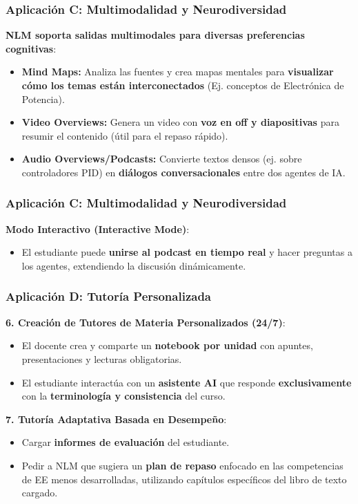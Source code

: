 \documentclass[aspectratio=43]{beamer}
\begin{document}
\begin{frame}
\frametitle{ Aplicación C: Multimodalidad y Neurodiversidad}

\textbf{NLM soporta salidas multimodales para diversas preferencias cognitivas}:
\begin{itemize}
    \item \textbf{Mind Maps:} Analiza las fuentes y crea mapas mentales para \textbf{visualizar cómo los temas están interconectados} (Ej. conceptos de Electrónica de Potencia).
    \item \textbf{Video Overviews:} Genera un video con \textbf{voz en off y diapositivas} para resumir el contenido (útil para el repaso rápido).
    \item \textbf{Audio Overviews/Podcasts:} Convierte textos densos (ej. sobre controladores PID) en \textbf{diálogos conversacionales} entre dos agentes de IA.
\end{itemize}
\end{frame}

\begin{frame}
\frametitle{ Aplicación C: Multimodalidad y Neurodiversidad}

\textbf{Modo Interactivo (Interactive Mode)}:
\begin{itemize}
    \item El estudiante puede \textbf{unirse al podcast en tiempo real} y hacer preguntas a los agentes, extendiendo la discusión dinámicamente.
\end{itemize}
\end{frame}

\begin{frame}
\frametitle{ Aplicación D: Tutoría Personalizada}

\textbf{6. Creación de Tutores de Materia Personalizados (24/7)}:
\begin{itemize}
    \item El docente crea y comparte un \textbf{notebook por unidad} con apuntes, presentaciones y lecturas obligatorias.
    \item El estudiante interactúa con un \textbf{asistente AI} que responde \textbf{exclusivamente} con la \textbf{terminología y consistencia} del curso.
\end{itemize}

\textbf{7. Tutoría Adaptativa Basada en Desempeño}:
\begin{itemize}
    \item Cargar \textbf{informes de evaluación} del estudiante.
    \item Pedir a NLM que sugiera un \textbf{plan de repaso} enfocado en las competencias de EE menos desarrolladas, utilizando capítulos específicos del libro de texto cargado.
\end{itemize}
\end{frame}
\end{document}
